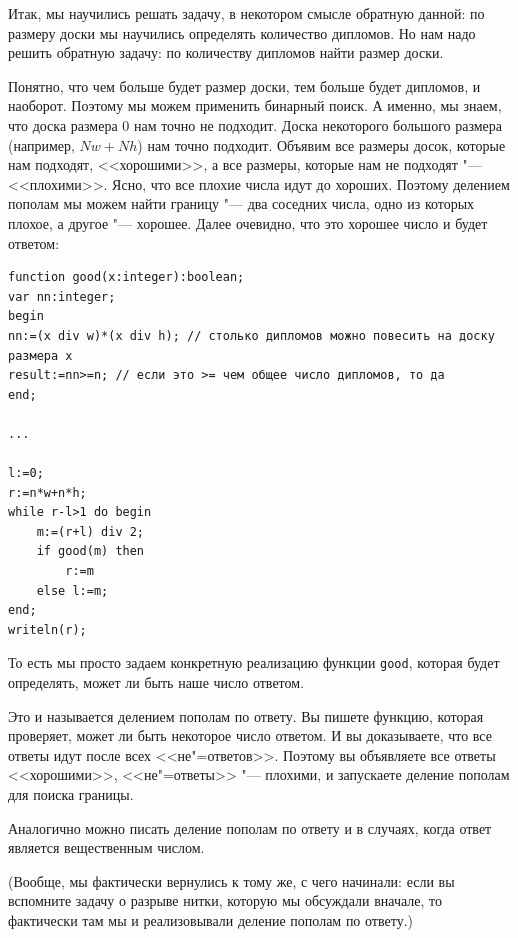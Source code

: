 \documentclass[a4paper,10pt]{problems}
\begin{document}
Итак, мы научились решать задачу, в некотором смысле обратную данной:
по размеру доски мы научились определять количество дипломов.
Но нам надо решить обратную задачу: по количеству дипломов найти размер доски.

Понятно, что чем больше будет размер доски, тем больше будет
дипломов, и наоборот. 
Поэтому мы можем применить бинарный поиск. 
А именно, мы знаем, что доска размера 0 нам точно не подходит.
Доска некоторого большого размера (например, $Nw+Nh$) нам точно подходит.
Объявим все размеры досок, которые нам подходят, <<хорошими>>,
а все размеры, которые нам не подходят "--- <<плохими>>.
Ясно, что все плохие числа идут до хороших.
Поэтому делением пополам мы можем найти границу "--- два соседних числа,
одно из которых плохое, а другое "--- хорошее.
Далее очевидно, что это хорошее число и будет ответом:
\begin{codesampleo}\begin{verbatim}
function good(x:integer):boolean;
var nn:integer;
begin
nn:=(x div w)*(x div h); // столько дипломов можно повесить на доску размера x
result:=nn>=n; // если это >= чем общее число дипломов, то да
end;

...

l:=0;
r:=n*w+n*h;  
while r-l>1 do begin    
    m:=(r+l) div 2;
    if good(m) then
        r:=m
    else l:=m;
end;
writeln(r);
\end{verbatim}
\end{codesampleo}

То есть мы просто задаем конкретную реализацию функции \verb`good`,
которая будет определять, может ли быть наше число ответом.

Это и называется делением пополам по ответу. 
Вы пишете функцию, которая проверяет, может ли быть некоторое число ответом.
И вы доказываете, что все ответы идут после всех <<не"=ответов>>.
Поэтому вы объявляете все ответы <<хорошими>>, <<не"=ответы>> "--- плохими,
и запускаете деление пополам для поиска границы.

Аналогично можно писать деление пополам по ответу и в случаях, когда ответ является
вещественным числом.

(Вообще, мы фактически вернулись к тому же, с чего начинали: если вы вспомните
задачу о разрыве нитки, которую мы обсуждали вначале, то фактически там мы
и реализовывали деление пополам по ответу.)

\end{document}
